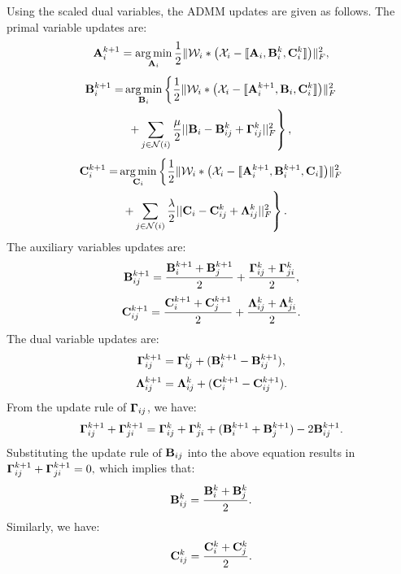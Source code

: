 \documentclass[journal]{IEEEtran}
\DeclareMathOperator*{\argmin}{arg\,min}
\newcommand{\cpd}[3]{\llbracket #1, #2, #3 \rrbracket}
\newcommand{\A}{{\bf A}}
\newcommand{\B}{{\bf B}}
\newcommand{\C}{{\bf C}}
\newcommand{\Ten}[1]{\mathcal{#1}}
\newcommand{\revision}[1]{{\color{black} #1}} %
\begin{document}
Using the scaled dual variables, the ADMM updates are given \revision{as follows.}
\newline The primal variable updates are: 
\[\A_i^{k+1} = \argmin_{\A_i} \frac{1}{2}\| \Ten{W}_i * \big(\Ten{X}_i - {\cpd{\A_i}{\B_i^k}{\C_i^k}} \big)\|_F^2,
\]
\begin{align*}
    \B_i^{k+1} = &\argmin_{\B_i} \left\{\frac{1}{2}\| \Ten{W}_i * \big(\Ten{X}_i - {\cpd{\A_i^{k+1}}{\B_i}{\C_i^k}} \big)\|_F^2\right.\\
    &\ \left.+\sum_{j\in\mathcal{N}(i)}\frac{\mu}{2}||\B_i-\B_{ij}^k+{\bf{\Gamma}}_{ij}^{k}||_F^2\right\},
\end{align*}
\begin{align*}
    \C_i^{k+1} = &\argmin_{\C_i} \left\{\frac{1}{2}\| \Ten{W}_i * \big(\Ten{X}_i - {\cpd{\A_i^{k+1}}{\B_i^{k+1}}{\C_i}} \big)\|_F^2\right.\\
    &\ \left.+\sum_{j\in\mathcal{N}(i)}\frac{\lambda}{2}||\C_i-\C_{ij}^k+{\bf{\Lambda}}_{ij}^{k}||_F^2\right\}.
\end{align*}
The auxiliary variables updates are: 
\[\B_{ij}^{k+1} = \frac{\B_i^{k+1}+\B_j^{k+1}}{2}+\frac{{\bf{\Gamma}}_{ij}^k+{\bf{\Gamma}}_{ji}^k}{2},\]
\[\C_{ij}^{k+1} = \frac{\C_i^{k+1}+\C_j^{k+1}}{2}+\frac{{\bf{\Lambda}}_{ij}^k+{\bf{\Lambda}}_{ji}^k}{2}.\]
The dual variable updates are:
\begin{align*}
    {\bf{\Gamma}}_{ij}^{k+1} = {\bf{\Gamma}}_{ij}^k +(\B_i^{k+1}-\B_{ij}^{k+1}),
\end{align*}
\begin{align*}
    {\bf{\Lambda}}_{ij}^{k+1} = {\bf{\Lambda}}_{ij}^k +(\C_i^{k+1}-\C_{ij}^{k+1}).
\end{align*}
From the update rule of ${\bf{\Gamma}}_{ij}$, we have: 
\[{\bf{\Gamma}}_{ij}^{k+1} + {\bf{\Gamma}}_{ji}^{k+1}= {\bf{\Gamma}}_{ij}^k+{\bf{\Gamma}}_{ji}^{k} +(\B_i^{k+1}+\B_j^{k+1})-2\B_{ij}^{k+1}.\]
Substituting the update rule of $\B_{ij}$ into the above equation results in 
${\bf{\Gamma}}_{ij}^{k+1} + {\bf{\Gamma}}_{ji}^{k+1}=0,$
which implies that: \[\B_{ij}^{k} = \frac{\B_i^{k}+\B_j^{k}}{2}.\]
Similarly, we have: \[\C_{ij}^{k} = \frac{\C_i^{k}+\C_j^{k}}{2}.\]
\end{document}
